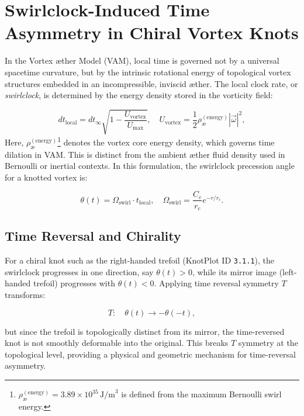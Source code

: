 
\section{Swirlclock-Induced Time Asymmetry in Chiral Vortex Knots}

In the Vortex \ae ther Model (VAM), local time is governed not by a universal spacetime curvature, but by the intrinsic rotational energy of topological vortex structures embedded in an incompressible, inviscid \ae ther. The local clock rate, or \emph{swirlclock}, is determined by the energy density stored in the vorticity field:

\begin{equation}
dt_{\text{local}} = dt_{\infty} \sqrt{1 - \frac{U_{\text{vortex}}}{U_{\text{max}}}}, \quad U_{\text{vortex}} = \frac{1}{2} \rho_\text{\ae}^{(\text{energy})} |\vec{\omega}|^2,
\end{equation}
\noindent
Here, \( \rho_\text{\ae}^{(\text{energy})} \)\footnote{$\rho_\text{\ae}^{(\text{energy})} = 3.89 \times 10^{35} \, \text{J/m}^3$
is defined from the maximum Bernoulli swirl energy.} denotes the vortex core energy density, which governs time dilation in VAM. This is distinct from the ambient æther fluid density used in Bernoulli or inertial contexts. In this formulation, the swirlclock precession angle for a knotted vortex is:

\begin{equation}
\theta(t) = \Omega_{\text{swirl}} \cdot t_{\text{local}}, \quad \Omega_{\text{swirl}} = \frac{C_e}{r_c} e^{-r/r_c}.
\end{equation}

\subsection{Time Reversal and Chirality}

For a chiral knot such as the right-handed trefoil (KnotPlot ID \texttt{3.1.1}), the swirlclock progresses in one direction, say $\theta(t) > 0$, while its mirror image (left-handed trefoil) progresses with $\theta(t) < 0$. Applying time reversal symmetry $T$ transforms:

\begin{equation}
T: \quad \theta(t) \rightarrow -\theta(-t),
\end{equation}

but since the trefoil is topologically distinct from its mirror, the time-reversed knot is not smoothly deformable into the original. This breaks $T$ symmetry at the topological level, providing a physical and geometric mechanism for time-reversal asymmetry.

